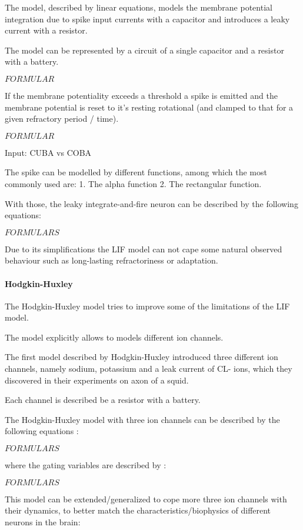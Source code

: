 The model, described by linear equations, models the membrane potential integration due to spike input currents with a capacitor and introduces a leaky current with a resistor. 

The model can be represented by a circuit of a single capacitor and a resistor with a battery.

$FORMULAR$

If the membrane potentiality exceeds a threshold a spike is emitted and the membrane potential is reset to it's resting rotational (and clamped to that for a given refractory period / time).

$FORMULAR$ 

Input: CUBA vs COBA

The spike can be modelled by different functions, among which the most commonly used are: 
1. The alpha function
2. The rectangular function. 

With those, the leaky integrate-and-fire neuron can be described by the following equations:

$FORMULARS$


Due to its simplifications the LIF model can not cape some natural observed behaviour such as long-lasting refractoriness or adaptation. 

\paragraph{Hodgkin-Huxley}

The Hodgkin-Huxley model tries to improve some of the limitations of the LIF model.

The model explicitly allows to models different ion channels. 

The first model described by Hodgkin-Huxley introduced three different ion channels, namely sodium, potassium and a leak current of CL- ions, which they discovered in their experiments on axon of a squid.

Each channel is described be a resistor with a battery.

The Hodgkin-Huxley model with three ion channels can be described by the following equations :

$FORMULARS$

where the gating variables are described by :

$FORMULARS$

This model can be extended/generalized to cope more three ion channels with their dynamics, to better match the characteristics/biophysics of different neurons in the brain:

